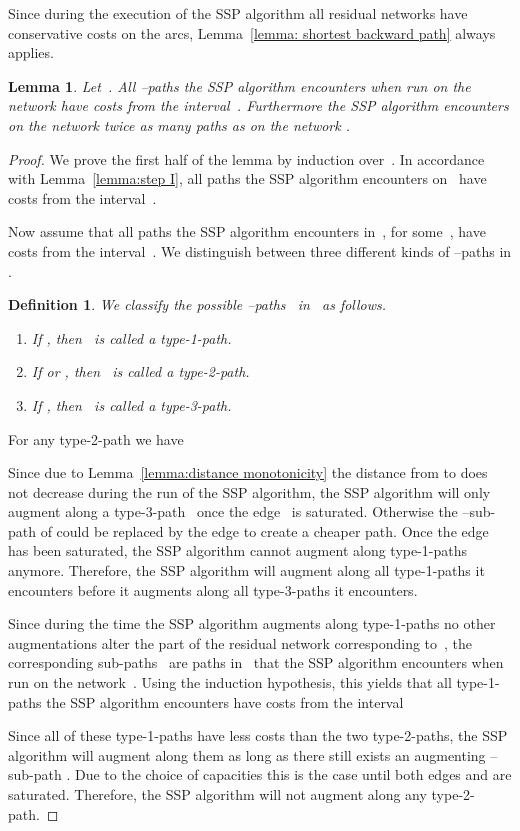 \documentclass[11pt]{article}
\newtheorem{lemma}[theorem]{Lemma}
\newtheorem{definition}[theorem]{Definition}
\begin{document}
Since during the execution of the SSP algorithm all residual networks have conservative costs on the arcs, Lemma~\ref{lemma: shortest backward path} always applies.
\begin{lemma}\label{lemma:CostsGi}
Let~.
All --paths the SSP algorithm encounters when run on the network  have costs from the interval~.
Furthermore the SSP algorithm encounters on  the network  twice as many paths as on the network .
\end{lemma}
\begin{proof}
We prove the first half of the lemma by induction over~.
In accordance with Lemma~\ref{lemma:step I}, all paths the SSP algorithm encounters on~ have costs from the interval~.

Now assume that all paths the SSP algorithm encounters in~, for some~, have costs from the interval~.
We distinguish between three different kinds of --paths in .
\begin{definition}
We classify the possible --paths~ in~ as follows.
\begin{enumerate}\setlength{\itemsep}{0em}
  \item If , then~ is called a \emph{type-1-path}.
  \item If  or , then~ is called a \emph{type-2-path}.
  \item If , then~ is called a \emph{type-3-path}.
\end{enumerate}
\end{definition}
For any type-2-path  we have 


Since due to Lemma~\ref{lemma:distance monotonicity} the distance from 
to  does not decrease during the run of the SSP algorithm, the SSP
algorithm will only augment along a type-3-path~ once the
edge~ is saturated. Otherwise the
--sub-path of  could be replaced by the edge 
to create a cheaper path. Once the edge  has been saturated,
the SSP algorithm cannot augment along type-1-paths anymore.
Therefore, the SSP algorithm will augment along all type-1-paths it encounters
before it augments along all type-3-paths it encounters.
 
Since during the time the SSP algorithm augments along type-1-paths no other
augmentations alter the part of the residual network corresponding to~,
the corresponding sub-paths~ are paths in~ that the
SSP algorithm encounters when run on the network~.
Using the induction hypothesis, this yields that all type-1-paths the SSP algorithm encounters have costs
from the interval

Since all of these type-1-paths have less costs than the two type-2-paths, the
SSP algorithm will augment along them as long as there still exists an
augmenting --sub-path . Due to the choice of capacities this is
the case until both edges  and  are saturated.
Therefore, the SSP algorithm will not augment along any type-2-path.


\end{proof}
\end{document}
